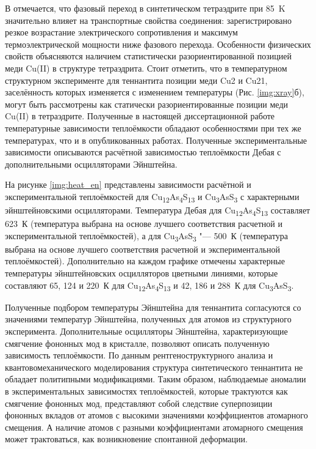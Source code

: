 В \cite{Lara-Curzio2014} отмечается, что фазовый переход в синтетическом тетраэдрите при 85~K значительно  влияет на транспортные свойства соединения: зарегистрировано резкое возрастание электрического сопротивления и максимум термоэлектрической мощности ниже фазового перехода.
Особенности физических свойств объясняются наличием статистически разориентированной позицией меди Cu(II) в структуре тетраэдрита. Стоит отметить, что в температурном структурном эксперименте для теннантита позиции меди Cu2 и Cu21, заселённость которых изменяется с изменением температуры (Рис. \ref{img:xray}б), могут быть рассмотрены как статически разориентированные позиции меди Cu(II) в тетраэдрите.
Полученные в настоящей диссертационной работе температурные  зависимости теплоёмкости обладают особенностями при тех же температурах, что и в опубликованных работах.
Полученные экспериментальные зависимости описываются расчётной зависимостью теплоёмкости Дебая с дополнительными осцилляторами Эйнштейна.

На рисунке \ref{img:heat_en} представлены зависимости расчётной и экспериментальной теплоёмкостей для  Cu\textsubscript{12}As\textsubscript{4}S\textsubscript{13} и Cu\textsubscript{3}AsS\textsubscript{3} с характерными эйнштейновскими осцилляторами.
Температура Дебая для Cu\textsubscript{12}As\textsubscript{4}S\textsubscript{13} составляет 623~К (температура выбрана на основе лучшего соответствия расчетной  и экспериментальной  теплоёмкостей), а для Cu\textsubscript{3}AsS\textsubscript{3} "--- 500~К (температура выбрана на основе лучшего соответствия расчетной  и экспериментальной  теплоёмкостей).
Дополнительно на каждом графике отмечены характерные температуры эйнштейновских осцилляторов цветными линиями, которые составляют 65, 124 и 220~К для Cu\textsubscript{12}As\textsubscript{4}S\textsubscript{13} и 42, 186 и 288~К для Cu\textsubscript{3}AsS\textsubscript{3}.

Полученные подбором температуры Эйнштейна для теннантита согласуются со значениями температур Эйнштейна, полученных для атомов из структурного эксперимента.
Дополнительные осцилляторы Эйнштейна, характеризующие смягчение фононных мод в кристалле\cite{bab_81}, позволяют описать полученную зависимость теплоёмкости.
По данным рентгеноструктурного анализа и квантовомеханического моделирования структура синтетического теннантита не обладает политипными модификациями. Таким образом, наблюдаемые аномалии в экспериментальных зависимостях теплоёмкостей, которые трактуются как смягчение фононных мод, представляют собой следствие суперпозиции фононных вкладов от атомов с высокими значениями коэффициентов атомарного смещения.
А наличие атомов с разными коэффициентами атомарного смещения может трактоваться, как возникновение спонтанной деформации\cite{bab_1982,bab_81}.


